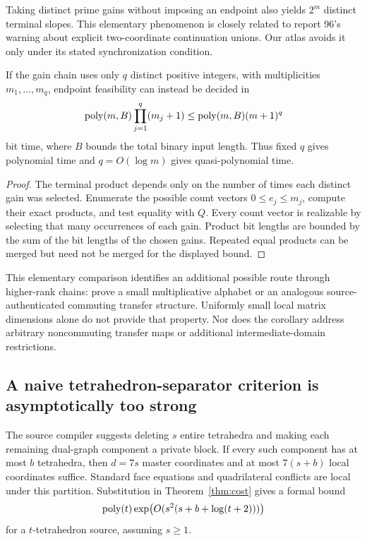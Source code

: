 Taking distinct prime gains without imposing an endpoint also yields $2^m$ distinct terminal slopes. This elementary phenomenon is closely related to report 96's warning about explicit two-coordinate continuation unions. Our atlas avoids it only under its stated synchronization condition.

\begin{corollary}
\label{cor:gain-alphabet}
If the gain chain uses only $q$ distinct positive integers, with multiplicities $m_1,\ldots,m_q$, endpoint feasibility can instead be decided in
\[
 \operatorname{poly}(m,B)\prod_{j=1}^q(m_j+1)\le\operatorname{poly}(m,B)(m+1)^q
\]
bit time, where $B$ bounds the total binary input length. Thus fixed $q$ gives polynomial time and $q=O(\log m)$ gives quasi-polynomial time.
\end{corollary}
\begin{proof}
The terminal product depends only on the number of times each distinct gain was selected. Enumerate the possible count vectors $0\le e_j\le m_j$, compute their exact products, and test equality with $Q$. Every count vector is realizable by selecting that many occurrences of each gain. Product bit lengths are bounded by the sum of the bit lengths of the chosen gains. Repeated equal products can be merged but need not be merged for the displayed bound.
\end{proof}

This elementary comparison identifies an additional possible route through higher-rank chains: prove a small multiplicative alphabet or an analogous source-authenticated commuting transfer structure. Uniformly small local matrix dimensions alone do not provide that property. Nor does the corollary address arbitrary noncommuting transfer maps or additional intermediate-domain restrictions.

\subsection{A naive tetrahedron-separator criterion is asymptotically too strong}
The source compiler suggests deleting $s$ entire tetrahedra and making each remaining dual-graph component a private block. If every such component has at most $b$ tetrahedra, then $d=7s$ master coordinates and at most $7(s+b)$ local coordinates suffice. Standard face equations and quadrilateral conflicts are local under this partition. Substitution in Theorem~\ref{thm:cost} gives a formal bound
\begin{equation}
 \operatorname{poly}(t)\exp\bigl(O(s^2(s+b+\log(t+2)))\bigr)
 \label{eq:naive-tet}
\end{equation}
for a $t$-tetrahedron source, assuming $s\ge1$.

